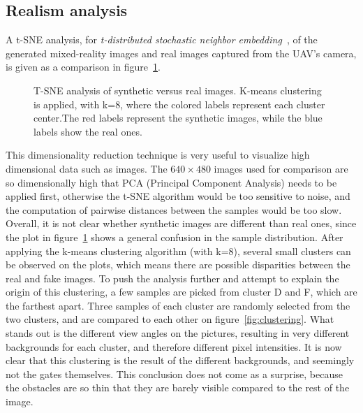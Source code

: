 \clearpage
\subsection{Realism analysis} \label{section-realism}

A t-SNE analysis, for \emph{t-distributed stochastic neighbor
embedding}~\cite{TSNE}, of the generated mixed-reality images and real images
captured from the UAV's camera, is given as a comparison in
figure~\ref{fig:tsne}.

\begin{figure}[h!]
   \centering
   \scalebox{0.8}{
      
   }
   \caption[T-SNE analysis of synthetic versus real images.]{T-SNE analysis of
      synthetic versus real images. K-means clustering is applied, with k=8,
      where the colored labels represent each cluster center.The red labels
   represent the synthetic images, while the blue labels show the real ones.}
   \label{fig:tsne}
\end{figure}

This dimensionality reduction technique is very useful to visualize high
dimensional data such as images. The $640 \times 480$ images used for
comparison are so dimensionally high that PCA (Principal Component Analysis)
needs to be applied first, otherwise the t-SNE algorithm would be too sensitive
to noise, and the computation of pairwise distances between the samples would
be too slow.\\

Overall, it is not clear whether synthetic images are different than real ones,
since the plot in figure~\ref{fig:tsne} shows a general confusion in the
sample distribution. After applying the k-means clustering algorithm (with
k=8), several small clusters can be observed on the plots, which means there
are possible disparities between the real and fake images. To push the analysis
further and attempt to explain the origin of this clustering, a few samples are
picked from cluster D and F, which are the farthest apart. Three samples of each
cluster are randomly selected from the two clusters, and are compared to each
other on figure~\ref{fig:clustering}. What stands out is the different view
angles on the pictures, resulting in very different backgrounds for each
cluster, and therefore different pixel intensities. It is now clear that this
clustering is the result of the different backgrounds, and seemingly not the
gates themselves. This conclusion does not come as a surprise, because the
obstacles are so thin that they are barely visible compared to the rest of the
image.

